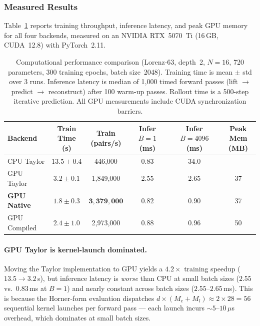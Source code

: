 \documentclass[11pt]{article}
\begin{document}
\subsubsection{Measured Results}

Table~\ref{tab:timing} reports training throughput, inference latency, and
peak GPU memory for all four backends, measured on an NVIDIA RTX~5070~Ti
(16\,GB, CUDA~12.8) with PyTorch~2.11.

\begin{table}[t]
\centering
\caption{Computational performance comparison (Lorenz-63, depth~2,
  $N\!=\!16$, 720 parameters, 300 training epochs, batch size~2048).
  Training time is mean $\pm$ std over 3 runs.  Inference latency is
  median of 1{,}000 timed forward passes (lift $\to$ predict $\to$
  reconstruct) after 100 warm-up passes.  Rollout time is a 500-step
  iterative prediction.  All GPU measurements include CUDA
  synchronization barriers.}
\label{tab:timing}
\begin{tabular}{lccccc}
\toprule
Backend & \shortstack{Train\\Time (s)} & \shortstack{Train\\(pairs/s)}
  & \shortstack{Infer $B\!=\!1$\\(ms)} & \shortstack{Infer $B\!=\!4096$\\(ms)}
  & \shortstack{Peak\\Mem (MB)} \\
\midrule
CPU Taylor       & $13.5 \pm 0.4$  & 446{,}000   & 0.83 & 34.0  & ---  \\
GPU Taylor       & $3.2 \pm 0.1$   & 1{,}849{,}000 & 2.55 & 2.65 & 37   \\
\textbf{GPU Native}  & $\mathbf{1.8 \pm 0.3}$ & $\mathbf{3{,}379{,}000}$
                     & $\mathbf{0.82}$ & $\mathbf{0.90}$ & 37 \\
GPU Compiled     & $2.4 \pm 1.0$   & 2{,}973{,}000 & 0.88 & 0.96 & 50   \\
\bottomrule
\end{tabular}
\end{table}

\paragraph{GPU Taylor is kernel-launch dominated.}
Moving the Taylor implementation to GPU yields a $4.2\times$ training speedup
($13.5 \to 3.2$\,s), but inference latency is \emph{worse} than CPU at
small batch sizes ($2.55$ vs.\ $0.83$\,ms at $B\!=\!1$) and nearly constant
across batch sizes ($2.55$--$2.65$\,ms).  This is because the Horner-form
evaluation dispatches $d \times (M_e + M_l) \approx 2 \times 28 = 56$
sequential kernel launches per forward pass --- each launch incurs
${\sim}5$--$10\,\mu$s overhead, which dominates at small batch sizes.
\end{document}
